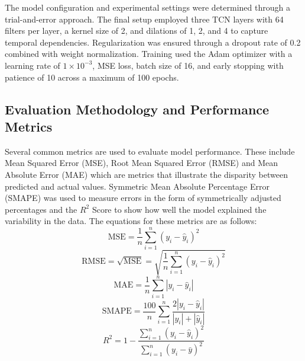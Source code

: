 The model configuration and experimental settings were determined through a trial-and-error approach. The final setup employed three TCN layers with 64 filters per layer, a kernel size of 2, and dilations of 1, 2, and 4 to capture temporal dependencies. Regularization was ensured through a dropout rate of 0.2 combined with weight normalization. Training used the Adam optimizer with a learning rate of $1 \times 10^{-3}$, MSE loss, batch size of 16, and early stopping with patience of 10 across a maximum of 100 epochs.



\subsection{Evaluation Methodology and Performance Metrics}
Several common metrics are used to evaluate model performance. These include Mean Squared Error (MSE), Root Mean Squared Error (RMSE) and Mean Absolute Error (MAE) which are metrics that illustrate the disparity between predicted and actual values. Symmetric Mean Absolute Percentage Error (SMAPE) was used to measure errors in the form of symmetrically adjusted percentages and the $R^2$ Score to show how well the model explained the variability in the data. The equations for these metrics are as follows:
\begin{equation}
    \text{MSE} = \frac{1}{n} \sum_{i=1}^{n} (y_i - \hat{y}_i)^2
\end{equation}
\begin{equation}
    \text{RMSE} = \sqrt{\text{MSE}} = \sqrt{ \frac{1}{n} \sum_{i=1}^{n} (y_i - \hat{y}_i)^2 }
\end{equation}
\begin{equation}
    \text{MAE} = \frac{1}{n} \sum_{i=1}^{n} |y_i - \hat{y}_i|
\end{equation}
\begin{equation}
   \text{SMAPE} = \frac{100}{n} \sum_{i=1}^{n} \frac{2|y_i - \hat{y}_i|}{|y_i| + |\hat{y}_i|}
\end{equation}
\begin{equation}
   R^2 = 1 - \frac{ \sum_{i=1}^{n} (y_i - \hat{y}_i)^2 }{ \sum_{i=1}^{n} (y_i - \bar{y})^2 }
\end{equation}

